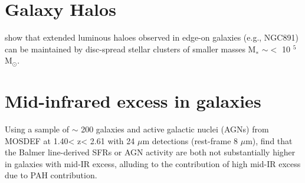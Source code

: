 \section{Galaxy Halos}

\cite{2023VasilievEvgenii} show that extended luminous haloes observed in edge-on galaxies (e.g., NGC891) can be maintained by disc-spread stellar clusters of smaller masses M$_∗$ $\sim < $  10 $^5$ M$_{\odot}$.



\section{Mid-infrared excess in galaxies}

Using a sample of $\sim$ 200 galaxies and active galactic nuclei (AGNs) from MOSDEF at 1.40< z< 2.61 with 24 $\mu$m detections (rest-frame 8 $\mu$m), \cite{2018Azadi} find that the Balmer line-derived SFRs or AGN activity are both not substantially higher in galaxies with mid-IR excess, alluding to the contribution of high mid-IR excess due to PAH contribution.



